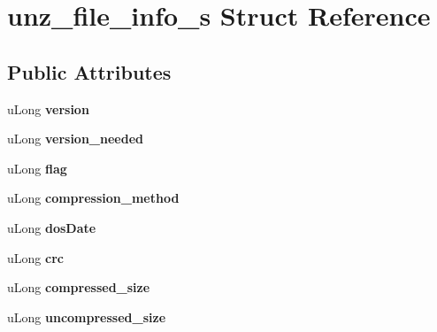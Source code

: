 \hypertarget{structunz__file__info__s}{\section{unz\-\_\-file\-\_\-info\-\_\-s Struct Reference}
\label{structunz__file__info__s}
}
\subsection*{Public Attributes}
\begin{DoxyCompactItemize}
\item 
\hypertarget{structunz__file__info__s_a635f933b26b636d8314cef61af62fcef}{u\-Long {\bfseries version}}\label{structunz__file__info__s_a635f933b26b636d8314cef61af62fcef}

\item 
\hypertarget{structunz__file__info__s_a1578aca2bb7fed658f9f94c78d00288e}{u\-Long {\bfseries version\-\_\-needed}}\label{structunz__file__info__s_a1578aca2bb7fed658f9f94c78d00288e}

\item 
\hypertarget{structunz__file__info__s_adff7171a3114d55e5532c593b1779ecc}{u\-Long {\bfseries flag}}\label{structunz__file__info__s_adff7171a3114d55e5532c593b1779ecc}

\item 
\hypertarget{structunz__file__info__s_aaaca88f0ebec5c1cfebb436b8e70a774}{u\-Long {\bfseries compression\-\_\-method}}\label{structunz__file__info__s_aaaca88f0ebec5c1cfebb436b8e70a774}

\item 
\hypertarget{structunz__file__info__s_a14bd7da84cada0f4b1455d60274eef91}{u\-Long {\bfseries dos\-Date}}\label{structunz__file__info__s_a14bd7da84cada0f4b1455d60274eef91}

\item 
\hypertarget{structunz__file__info__s_a6d741cb2df07794d7a4794841148893b}{u\-Long {\bfseries crc}}\label{structunz__file__info__s_a6d741cb2df07794d7a4794841148893b}

\item 
\hypertarget{structunz__file__info__s_a35ee9d733879c87565e40a545fe46fb6}{u\-Long {\bfseries compressed\-\_\-size}}\label{structunz__file__info__s_a35ee9d733879c87565e40a545fe46fb6}

\item 
\hypertarget{structunz__file__info__s_a7696a98511bc57e389485e5313a9c2bf}{u\-Long {\bfseries uncompressed\-\_\-size}}\label{structunz__file__info__s_a7696a98511bc57e389485e5313a9c2bf}


\end{DoxyCompactItemize}
